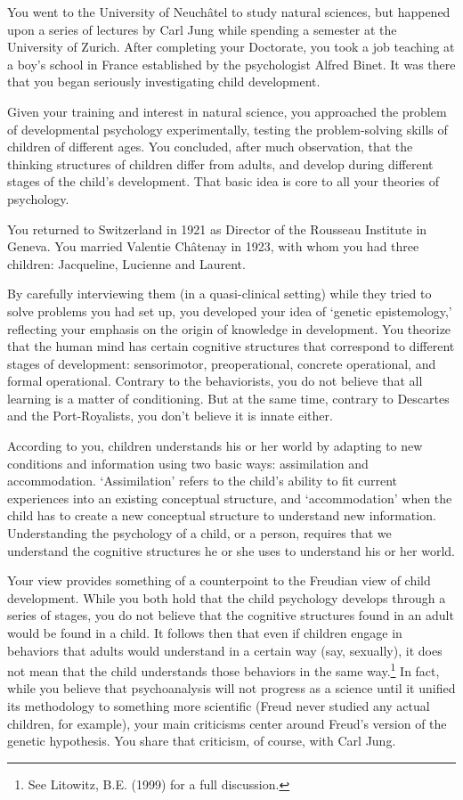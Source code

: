 You went to the University of Neuchâtel to study natural sciences, but happened upon a series of lectures by Carl Jung while spending a semester at the University of Zurich. After completing your Doctorate, you took a job teaching at a boy's school in France established by the psychologist Alfred Binet. It was there that you began seriously investigating child development.

Given your training and interest in natural science, you approached the problem of developmental psychology experimentally, testing the problem-solving skills of children of different ages. You concluded, after much observation, that the thinking structures of children differ from adults, and develop during different stages of the child's development. That basic idea is core to all your theories of psychology.

You returned to Switzerland in 1921 as Director of the Rousseau Institute in Geneva. You married Valentie Châtenay in 1923, with whom you had three children: Jacqueline, Lucienne and Laurent. 

By carefully interviewing them (in a quasi-clinical setting) while they tried to solve problems you had set up, you developed your idea of `genetic epistemology,' reflecting your emphasis on the origin of knowledge in development. You theorize that the human mind has certain cognitive structures that correspond to different stages of development: sensorimotor, preoperational, concrete operational, and formal operational. Contrary to the behaviorists, you do not believe that all learning is a matter of conditioning. But at the same time, contrary to Descartes and the Port-Royalists, you don't believe it is innate either. 

According to you, children understands his or her world by adapting to new conditions and information using two basic ways: assimilation and accommodation. `Assimilation' refers to the child's ability to fit current experiences into an existing conceptual structure, and `accommodation' when the child has to create a new conceptual structure to understand new information. Understanding the psychology of a child, or a person, requires that we understand the cognitive structures he or she uses to understand his or her world.

Your view provides something of a counterpoint to the Freudian view of child development. While you both hold that the child psychology develops through a series of stages, you do not believe that the cognitive structures found in an adult would be found in a child. It follows then that even if children engage in behaviors that adults would understand in a certain way (say, sexually), it does not mean that the child understands those behaviors in the same way.\footnote{See Litowitz, B.E. (1999) for a full discussion.} In fact, while you believe that psychoanalysis will not progress as a science until it unified its methodology to something more scientific (Freud never studied any actual children, for example), your main criticisms center around Freud's version of the genetic hypothesis. You share that criticism, of course, with Carl Jung.

